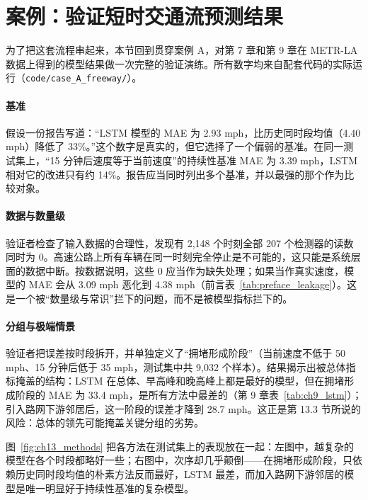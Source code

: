 \section{案例：验证短时交通流预测结果}

为了把这套流程串起来，本节回到贯穿案例 A，对第 7 章和第 9 章在 METR-LA 数据上得到的模型结果做一次完整的验证演练。所有数字均来自配套代码的实际运行（\texttt{code/case\_A\_freeway/}）。

\paragraph{基准} 假设一份报告写道：“LSTM 模型的 MAE 为 2.93 mph，比历史同时段均值（4.40 mph）降低了 33\%。”这个数字是真实的，但它选择了一个偏弱的基准。在同一测试集上，“15 分钟后速度等于当前速度”的持续性基准 MAE 为 3.39 mph，LSTM 相对它的改进只有约 14\%。报告应当同时列出多个基准，并以最强的那个作为比较对象。

\paragraph{数据与数量级} 验证者检查了输入数据的合理性，发现有 2,148 个时刻全部 207 个检测器的读数同时为 0。高速公路上所有车辆在同一时刻完全停止是不可能的，这只能是系统层面的数据中断。按数据说明，这些 0 应当作为缺失处理；如果当作真实速度，模型的 MAE 会从 3.09 mph 恶化到 4.38 mph（前言表~\ref{tab:preface_leakage}）。这是一个被“数量级与常识”拦下的问题，而不是被模型指标拦下的。

\paragraph{分组与极端情景} 验证者把误差按时段拆开，并单独定义了“拥堵形成阶段”（当前速度不低于 50 mph、15 分钟后低于 35 mph，测试集中共 9,032 个样本）。结果揭示出被总体指标掩盖的结构：LSTM 在总体、早高峰和晚高峰上都是最好的模型，但在拥堵形成阶段的 MAE 为 33.4 mph，是所有方法中最差的（第 9 章表~\ref{tab:ch9_lstm}）；引入路网下游邻居后，这一阶段的误差才降到 28.7 mph。这正是第 13.3 节所说的风险：总体的领先可能掩盖关键分组的劣势。

图~\ref{fig:ch13_methods} 把各方法在测试集上的表现放在一起：左图中，越复杂的模型在各个时段都略好一些；右图中，次序却几乎颠倒——在拥堵形成阶段，只依赖历史同时段均值的朴素方法反而最好，LSTM 最差，而加入路网下游邻居的模型是唯一明显好于持续性基准的复杂模型。


